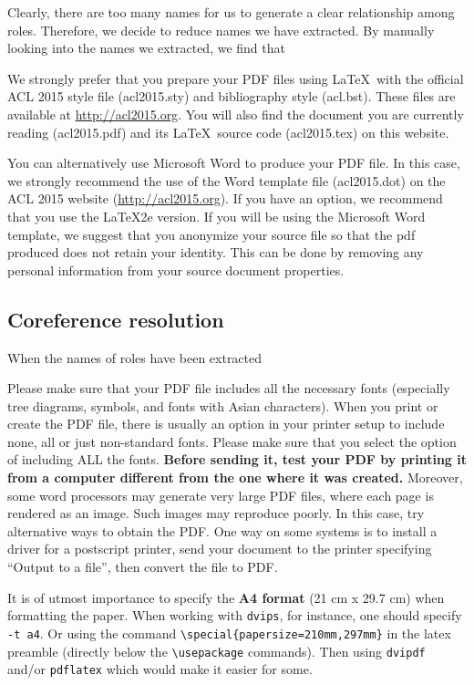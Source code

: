 \documentclass[11pt]{article}
\begin{document}
Clearly, there are too many names for us to generate a clear relationship among roles. Therefore, we decide to reduce names we have extracted. By manually looking into the names we extracted, we find that 

We strongly prefer that you prepare your PDF files using \LaTeX\ with
the official ACL 2015 style file (acl2015.sty) and bibliography style
(acl.bst). These files are available at
\url{http://acl2015.org}. You will also find the document
you are currently reading (acl2015.pdf) and its \LaTeX\ source code
(acl2015.tex) on this website.

You can alternatively use Microsoft Word to produce your PDF file. In
this case, we strongly recommend the use of the Word template file
(acl2015.dot) on the ACL 2015 website (\url{http://acl2015.org}). 
If you have an option, we recommend that you use the \LaTeX2e version. 
If you will be using the Microsoft Word template, we suggest that you 
anonymize your source file so that the pdf produced does not retain your
identity.  This can be done by removing any personal information
from your source document properties.



\subsection{Coreference resolution} %
\label{sect:pdf}

When the names of roles have been extracted 

Please make sure that your PDF file includes all the necessary fonts
(especially tree diagrams, symbols, and fonts with Asian
characters). When you print or create the PDF file, there is usually
an option in your printer setup to include none, all or just
non-standard fonts.  Please make sure that you select the option of
including ALL the fonts. \textbf{Before sending it, test your PDF by
  printing it from a computer different from the one where it was
  created.} Moreover, some word processors may generate very large PDF
files, where each page is rendered as an image. Such images may
reproduce poorly. In this case, try alternative ways to obtain the
PDF. One way on some systems is to install a driver for a postscript
printer, send your document to the printer specifying ``Output to a
file'', then convert the file to PDF.

It is of utmost importance to specify the \textbf{A4 format} (21 cm
x 29.7 cm) when formatting the paper. When working with
{\tt dvips}, for instance, one should specify {\tt -t a4}.
Or using the command \verb|\special{papersize=210mm,297mm}| in the latex
preamble (directly below the \verb|\usepackage| commands). Then using 
{\tt dvipdf} and/or {\tt pdflatex} which would make it easier for some.
\end{document}
